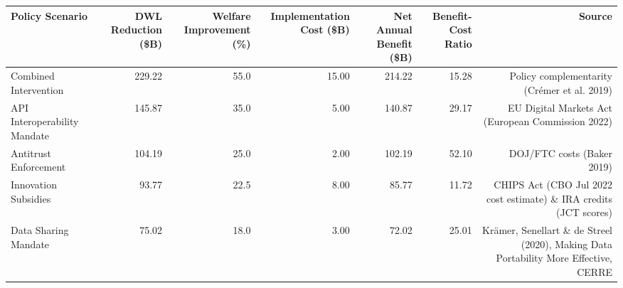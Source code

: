 

\begin{tabular}{@{}lrrrrrr@{}}
\toprule
Policy Scenario & DWL Reduction (\$B) & Welfare Improvement (\%) & Implementation Cost (\$B) & Net Annual Benefit (\$B) & Benefit-Cost Ratio & Source \\
\midrule
Combined Intervention & 229.22 & 55.0 & 15.00 & 214.22 & 15.28 & Policy complementarity (Crémer et al. 2019) \\
API Interoperability Mandate & 145.87 & 35.0 & 5.00 & 140.87 & 29.17 & EU Digital Markets Act (European Commission 2022) \\
Antitrust Enforcement & 104.19 & 25.0 & 2.00 & 102.19 & 52.10 & DOJ/FTC costs (Baker 2019) \\
Innovation Subsidies & 93.77 & 22.5 & 8.00 & 85.77 & 11.72 & CHIPS Act (CBO Jul 2022 cost estimate) \& IRA credits (JCT scores) \\
Data Sharing Mandate & 75.02 & 18.0 & 3.00 & 72.02 & 25.01 & Krämer, Senellart \& de Streel (2020), Making Data Portability More Effective, CERRE \\
\bottomrule
\end{tabular}
